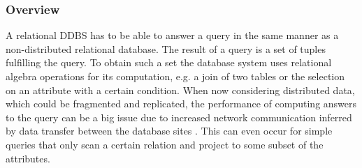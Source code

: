 \subsubsection{Overview}
\label{sec:theo_dqp_over}
A relational DDBS has to be able to answer a query in the same manner as a non-distributed relational database. The result of a query is a set of tuples
fulfilling the query. To obtain such a set the database system uses relational algebra operations for its computation, e.g. a join of two tables or the
selection on an attribute with a certain condition. When now considering distributed data, which could be fragmented and replicated, the performance of
computing answers to the query can be a big issue due to increased network communication inferred by data transfer between the database sites 
\cite[p.~173]{Ozsu1991}. This can even occur for simple queries that only scan a certain relation and project to some subset of the attributes.


